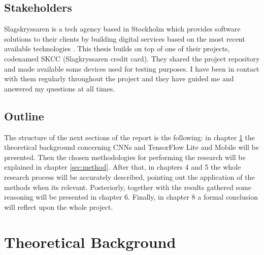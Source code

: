 \subsection{Stakeholders}
Slagskryssaren is a tech agency based in Stockholm which provides software solutions to their clients by building digital services based on the most recent available technologies \cite{slagkr2018}. This thesis builds on top of one of their projects, codenamed SKCC (Slagkryssaren credit card). They shared the project repository and made available some devices used for testing purposes. I have been in contact with them regularly throughout the project and they have guided me and answered my questions at all times. \\

\subsection{Outline}
The structure of the next sections of the report is the following: in chapter \ref{sec:background} the theoretical background concerning CNNs and TensorFlow Lite and Mobile will be presented. Then the chosen methodologies for performing the research will be explained in chapter \ref{sec:method}. After that, in chapters 4 and 5 the whole research process will be accurately described, pointing out the application of the methods when its relevant. Posteriorly, together with the results gathered some reasoning will be presented in chapter 6. Finally, in chapter 8 a formal conclusion will reflect upon the whole project. \\


\newpage   
\section{Theoretical Background}\label{sec:background}


